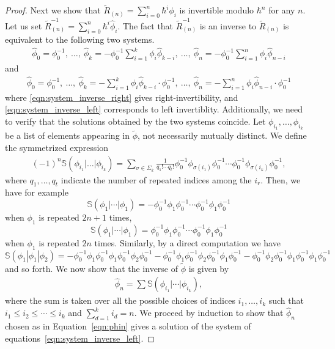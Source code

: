 \documentclass[11pt,fleqn]{amsart} %
\begin{document}
\begin{proof}
		Next  we  
		show that $\tilde R_{(n)}  = \sum_{i=0}^n \hbar^i\phi_i$ is invertible modulo $\hbar^n$ for any $n$. Let us set 
	 $\tilde R^{-1}_{(n)}  = \sum_{i=0}^n \hbar^i  \hat \phi_i$. The fact that  $\tilde R^{-1}_{(n)}$ is an inverse to $\tilde R_{(n)}$ is equivalent to the following two systems. 
		\begin{eqnarray}\label{eqn:system_inverse_right}
	\hat \phi_0 = \phi_0^{-1}, \ 
					\ldots, \ 
					\hat\phi_k = -\phi_0^{-1}\sum_{i=1}^k \phi_i\hat\phi_{k-i},
					\  \ldots, \ 
										\hat\phi_n = -\phi_0^{-1}\sum_{i=1}^n \phi_i\hat\phi_{n-i}
\end{eqnarray}
		and 
		\begin{eqnarray}\label{eqn:system_inverse_left}
\hat \phi_0 = \phi_0^{-1}, \ \ldots, \  	\hat\phi_k = -\sum_{i=1}^k \phi_i\hat\phi_{k-i}\cdot \phi_0^{-1}, \ \ldots, \  
 	\hat\phi_n = -\sum_{i=1}^n \phi_i\hat\phi_{n-i} \cdot \phi_0^{-1}
		\end{eqnarray}
		where \eqref{eqn:system_inverse_right} gives right-invertibility, and \eqref{eqn:system_inverse_left} corresponds to left invertiblity. 
		Additionally, we need to verify that the solutions obtained by the two systems coincide. Let $\phi_{i_1}, \ldots, \phi_{i_k}$ be a list of elements appearing in $\tilde \phi$, not necessarily mutually distinct. We define the symmetrized expression
		\begin{eqnarray}
				(-1)^n\mathbb S(\phi_{i_1}|\ldots|\phi_{i_k}) = \sum_{\sigma\in \Sigma_k} \frac{1}{q_1!\cdots q_t!} \phi_0^{-1}\phi_{\sigma(i_1)}\phi_0^{-1} \cdots \phi_0^{-1} \phi_{\sigma(i_k)}\phi_0^{-1},
		\end{eqnarray}
		where $q_1, \ldots, q_t$ indicate the number of repeated indices among the $i_r$. Then, we have for example 
		$$\mathbb S(\phi_1| \cdots | \phi_1) = - \phi_0^{-1}\phi_1\phi_0^{-1} \cdots \phi_0^{-1} \phi_1\phi_0^{-1}$$
		when $\phi_1$ is repeated $2n+1$ times, 
		$$\mathbb S(\phi_1| \cdots | \phi_1) = \phi_0^{-1}\phi_1\phi_0^{-1} \cdots \phi_0^{-1} \phi_1\phi_0^{-1}$$
		 when $\phi_1$ is repeated $2n$ times. Similarly, by a direct computation we have 
		 $$\mathbb S(\phi_1|\phi_1|\phi_2) = - \phi_0^{-1}\phi_1\phi_0^{-1}\phi_1\phi_0^{-1}\phi_2\phi_0^{-1} - \phi_0^{-1}\phi_1\phi_0^{-1}\phi_2\phi_0^{-1}\phi_1\phi_0^{-1} - \phi_0^{-1}\phi_2\phi_0^{-1}\phi_1\phi_0^{-1}\phi_1\phi_0^{-1}$$
		  and so forth. We  
		  now show  that the inverse of $\tilde \phi$ is given by 
		\begin{eqnarray}\label{eqn:phin}
				\hat \phi_n = \sum \mathbb S(\phi_{i_1}| \cdots |\phi_{i_k}),
		\end{eqnarray}
		where the sum is taken over all the possible choices of indices $i_1, \ldots, i_k$ such that $i_1 \leq i_2 \leq \cdots \leq i_k$ and $\sum_{d=1}^k i_d = n$. We proceed by induction to show that $\hat \phi_n$ chosen as in Equation~\eqref{eqn:phin} gives a solution of the system of equations~\eqref{eqn:system_inverse_left}. 
		

\end{proof}
\end{document}
